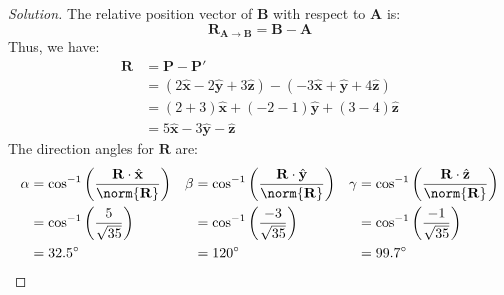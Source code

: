 \documentclass[crop=false,class=book,oneside]{standalone}
\begin{document}
            \begin{proof}[Solution]
                The relative position vector of $\mathbf{B}$
                with respect to $\mathbf{A}$ is:
                \begin{equation*}
                    \mathbf{R}_{\mathbf{A}\rightarrow\mathbf{B}}
                    =\mathbf{B}-\mathbf{A}
                \end{equation*}
                Thus, we have:
                \begin{align*}
                    \mathbf{R}&=\mathbf{P}-\mathbf{P}'\\
                    &=
                    (2\hat{\mathbf{x}}
                    -2\hat{\mathbf{y}}
                    +3\hat{\mathbf{z}})
                    -
                    (-3\hat{\mathbf{x}}
                    +\hat{\mathbf{y}}
                    +4\hat{\mathbf{z}})\\
                    &
                    =(2+3)\hat{\mathbf{x}}
                    +(-2-1)\hat{\mathbf{y}}
                    +(3-4)\hat{\mathbf{z}}\\
                    &
                    =5\hat{\mathbf{x}}
                    -3\hat{\mathbf{y}}
                    -\hat{\mathbf{z}}
                \end{align*}
                The direction angles for $\mathbf{R}$ are:
                \begin{align*}
                    \alpha
                    &=\cos^{-1}\bigg(
                        \frac{\mathbf{R}\cdot\hat{\mathbf{x}}}
                        {\norm{\mathbf{R}}}
                    \bigg)
                    &
                    \beta
                    &=\cos^{-1}\bigg(
                        \frac{\mathbf{R}\cdot\hat{\mathbf{y}}}
                        {\norm{\mathbf{R}}}
                    \bigg)
                    &
                    \gamma
                    &=\cos^{-1}\bigg(
                        \frac{\mathbf{R}\cdot\hat{\mathbf{z}}}
                        {\norm{\mathbf{R}}}
                    \bigg)\\
                    &=\cos^{-1}\bigg(\frac{5}{\sqrt{35}}\bigg)
                    &
                    &=\cos^{-1}\bigg(\frac{-3}{\sqrt{35}}\bigg)
                    &
                    &=\cos^{-1}\bigg(\frac{-1}{\sqrt{35}}\bigg)\\
                    &=32.5^{\circ}
                    &
                    &=120^{\circ}
                    &
                    &=99.7^{\circ}
                \end{align*}
            \end{proof}
\end{document}
